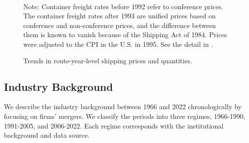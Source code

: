 \documentclass[10pt]{article}
\begin{document}
\begin{figure}[!ht]
\begin{center}
  \\
  \caption{Trends in route-year-level shipping prices and quantities.}
  \label{fg:container_freight_rate_and_shipping_quantity_each_route}
  \end{center}
\footnotesize
  Note: Container freight rates before 1992 refer to conference prices. The container freight rates after 1993 are unified prices based on conference and non-conference prices, and the difference between them is known to vanish because of the Shipping Act of 1984. Prices were adjusted to the CPI in the U.S. in 1995. See the detail in \cite{matsuda2022unified}.
\end{figure}

\subsection{Industry Background}
We describe the industry background between 1966 and 2022 chronologically by focusing on firms' mergers. 
We classify the periods into three regimes, 1966-1990, 1991-2005, and 2006-2022. Each regime corresponds with the institutional background and data source.
\end{document}
